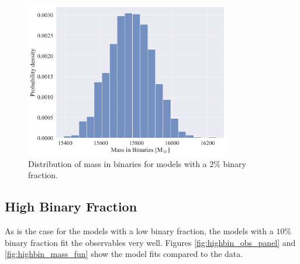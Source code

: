 \begin{figure}
	\centering
	\includegraphics[width=0.8\textwidth]{figures/low_bin_model/binary_mass.png}
	\caption{Distribution of mass in binaries for models with a $2\%$ binary fraction.}
	\label{fig:low_bin_model_Bin_mass}
\end{figure}


\subsection{High Binary Fraction}

As is the case for the models with a low binary fraction, the models with a $10\%$ binary
fraction fit the observables very well. Figures \ref{fig:highbin_obs_panel} and
\ref{fig:highbin_mass_fun} show the model fits compared to the data.


